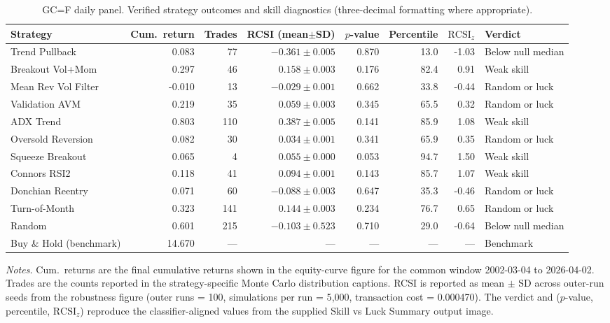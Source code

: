 \documentclass[preprint,12pt]{elsarticle}
\theoremstyle{definition}
\begin{document}
\clearpage
\begin{table}[p]
\centering
\caption{GC=F daily panel. Verified strategy outcomes and skill diagnostics (three-decimal formatting where appropriate).}
\label{tab:main}
{\small
\renewcommand{\arraystretch}{1.15}
\setlength{\tabcolsep}{5pt}
\begin{adjustbox}{max width=\textwidth}
\begin{tabular}{@{}lrrrrrrl@{}}
\toprule
Strategy & Cum.\ return & Trades & RCSI (mean$\pm$SD) & $p$-value & Percentile & $\mathrm{RCSI}_z$ & Verdict \\
\midrule
Trend Pullback      & 0.083 &  77 & $-0.361\pm0.005$ & 0.870 & 13.0 & -1.03 & Below null median \\
Breakout Vol+Mom    & 0.297 &  46 & $\phantom{-}0.158\pm0.003$ & 0.176 & 82.4 & \phantom{-}0.91 & Weak skill \\
Mean Rev Vol Filter & -0.010 & 13 & $-0.029\pm0.001$ & 0.662 & 33.8 & -0.44 & Random or luck \\
Validation AVM      & 0.219 &  35 & $\phantom{-}0.059\pm0.003$ & 0.345 & 65.5 & \phantom{-}0.32 & Random or luck \\
ADX Trend           & 0.803 & 110 & $\phantom{-}0.387\pm0.005$ & 0.141 & 85.9 & \phantom{-}1.08 & Weak skill \\
Oversold Reversion  & 0.082 &  30 & $\phantom{-}0.034\pm0.001$ & 0.341 & 65.9 & \phantom{-}0.35 & Random or luck \\
Squeeze Breakout    & 0.065 &   4 & $\phantom{-}0.055\pm0.000$ & 0.053 & 94.7 & \phantom{-}1.50 & Weak skill \\
Connors RSI2        & 0.118 &  41 & $\phantom{-}0.094\pm0.001$ & 0.143 & 85.7 & \phantom{-}1.07 & Weak skill \\
Donchian Reentry    & 0.071 &  60 & $-0.088\pm0.003$ & 0.647 & 35.3 & -0.46 & Random or luck \\
Turn-of-Month       & 0.323 & 141 & $\phantom{-}0.144\pm0.003$ & 0.234 & 76.7 & \phantom{-}0.65 & Random or luck \\
Random              & 0.601 & 215 & $-0.103\pm0.523$ & 0.710 & 29.0 & -0.64 & Below null median \\
\midrule
Buy \& Hold (benchmark) & 14.670 & --- & --- & --- & --- & --- & Benchmark \\
\bottomrule
\end{tabular}
\end{adjustbox}
}
\par\vspace{0.75em}
\begin{minipage}{0.95\textwidth}
\centering
\footnotesize\emph{Notes.} Cum.\ returns are the final cumulative returns shown in the equity-curve figure for the common window 2002-03-04 to 2026-04-02. Trades are the counts reported in the strategy-specific Monte Carlo distribution captions. RCSI is reported as mean $\pm$ SD across outer-run seeds from the robustness figure (outer runs = 100, simulations per run = 5{,}000, transaction cost = 0.000470). The verdict and ($p$-value, percentile, $\mathrm{RCSI}_z$) reproduce the classifier-aligned values from the supplied Skill vs Luck Summary output image.
\end{minipage}
\end{table}
\clearpage
\end{document}
